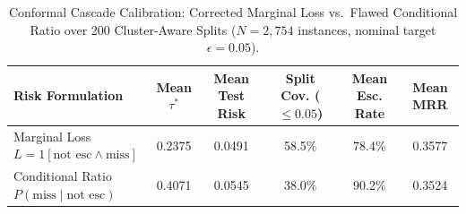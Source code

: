 \begin{table}[t]
\centering\small
\caption{Conformal Cascade Calibration: Corrected Marginal Loss vs.\ Flawed Conditional Ratio over 200 Cluster-Aware Splits ($N=2{,}754$ instances, nominal target $\epsilon=0.05$).}\label{tab:conformal_cascade_v6}
\begin{tabular}{lccccc}
\toprule
Risk Formulation & Mean $\tau^*$ & Mean Test Risk & Split Cov. ($\le 0.05$) & Mean Esc. Rate & Mean MRR \\
\midrule
Marginal Loss $L=1[\text{not esc} \land \text{miss}]$ & 0.2375 & 0.0491 & 58.5\% & 78.4\% & 0.3577 \\
Conditional Ratio $P(\text{miss} \mid \text{not esc})$ & 0.4071 & 0.0545 & 38.0\% & 90.2\% & 0.3524 \\
\bottomrule
\end{tabular}
\end{table}
